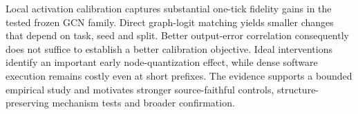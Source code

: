 Local activation calibration captures substantial one-tick fidelity gains in the tested frozen GCN family. Direct graph-logit matching yields smaller changes that depend on task, seed and split. Better output-error correlation consequently does not suffice to establish a better calibration objective. Ideal interventions identify an important early node-quantization effect, while dense software execution remains costly even at short prefixes. The evidence supports a bounded empirical study and motivates stronger source-faithful controls, structure-preserving mechanism tests and broader confirmation.
